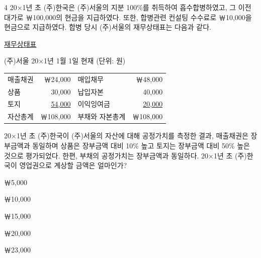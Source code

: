 \begin{question}{4}
20×1년 초 (주)한국은 (주)서울의 지분 100\%를 취득하여 흡수합병하였고, 그 이전대가로 ￦100,000의 현금을 지급하였다. 또한, 합병관련 컨설팅 수수료로 ￦10,000을 현금으로 지급하였다. 합병 당시 (주)서울의 재무상태표는 다음과 같다.

\begin{center}\uline{재무상태표}\end{center}
\noindent (주)서울 \hfill 20×1년 1월 1일 현재 \hfill (단위: 원)\par

{\small\centering
\begin{tabular}{l r | l r}
\hline
매출채권 & ￦24,000 & 매입채무 & ￦48,000 \\
상품 & 30,000 & 납입자본 & 40,000 \\
토지 & \uline{54,000} & 이익잉여금 & \uline{20,000} \\
자산총계 & ￦108,000 & 부채와 자본총계 & ￦108,000 \\
\end{tabular}\par}

20×1년 초 (주)한국이 (주)서울의 자산에 대해 공정가치를 측정한 결과, 매출채권은 장부금액과 동일하며 상품은 장부금액 대비 10\% 높고 토지는 장부금액 대비 50\% 높은 것으로 평가되었다. 한편, 부채의 공정가치는 장부금액과 동일하다. 20×1년 초 (주)한국이 영업권으로 계상할 금액은 얼마인가?
\begin{choices}
  \item ￦5,000
  \item ￦10,000
  \item ￦15,000
  \item ￦20,000
  \item ￦23,000
\end{choices}
\end{question}
